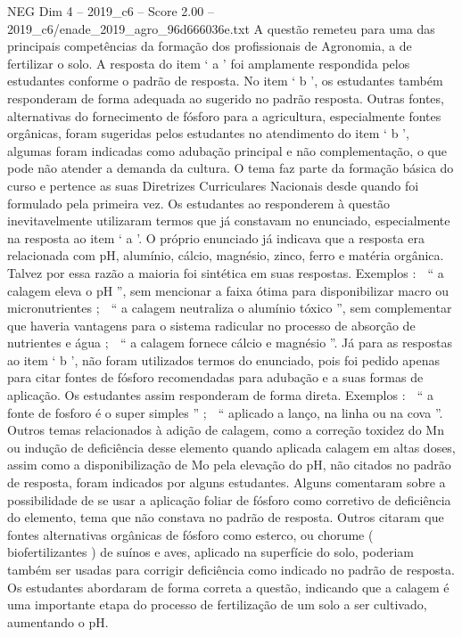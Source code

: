 \begin{textsample}{NEG Dim 4 – 2019\_c6 – Score 2.00 – 2019\_c6/enade\_2019\_agro\_96d666036e.txt}
A questão remeteu para uma das principais competências da formação dos profissionais de Agronomia, a de fertilizar o solo.
A resposta do item ‘ a ’ foi amplamente respondida pelos estudantes conforme o padrão de resposta.
No item ‘ b ’, os estudantes também responderam de forma adequada ao sugerido no padrão resposta.
Outras fontes, alternativas do fornecimento de fósforo para a agricultura, especialmente fontes orgânicas, foram sugeridas pelos estudantes no atendimento do item ‘ b ’, algumas foram indicadas como adubação principal e não complementação, o que pode não atender a demanda da cultura.
O tema faz parte da formação básica do curso e pertence as suas Diretrizes Curriculares Nacionais desde quando foi formulado pela primeira vez.
Os estudantes ao responderem à questão inevitavelmente utilizaram termos que já constavam no enunciado, especialmente na resposta ao item ‘ a ’.
O próprio enunciado já indicava que a resposta era relacionada com pH, alumínio, cálcio, magnésio, zinco, ferro e matéria orgânica.
Talvez por essa razão a maioria foi sintética em suas respostas.
Exemplos :  “ a calagem eleva o pH ”, sem mencionar a faixa ótima para disponibilizar macro ou micronutrientes ;  “ a calagem neutraliza o alumínio tóxico ”, sem complementar que haveria vantagens para o sistema radicular no processo de absorção de nutrientes e água ;  “ a calagem fornece cálcio e magnésio ”.
Já para as respostas ao item ‘ b ’, não foram utilizados termos do enunciado, pois foi pedido apenas para citar fontes de fósforo recomendadas para adubação e a suas formas de aplicação.
Os estudantes assim responderam de forma direta.
Exemplos :  “ a fonte de fosforo é o super simples ” ;  “ aplicado a lanço, na linha ou na cova ”.
Outros temas relacionados à adição de calagem, como a correção toxidez do Mn ou indução de deficiência desse elemento quando aplicada calagem em altas doses, assim como a disponibilização de Mo pela elevação do pH, não citados no padrão de resposta, foram indicados por alguns estudantes.
Alguns comentaram sobre a possibilidade de se usar a aplicação foliar de fósforo como corretivo de deficiência do elemento, tema que não constava no padrão de resposta.
Outros citaram que fontes alternativas orgânicas de fósforo como esterco, ou chorume ( biofertilizantes ) de suínos e aves, aplicado na superfície do solo, poderiam também ser usadas para corrigir deficiência como indicado no padrão de resposta.
Os estudantes abordaram de forma correta a questão, indicando que a calagem é uma importante etapa do processo de fertilização de um solo a ser cultivado, aumentando o pH.

\end{textsample}

